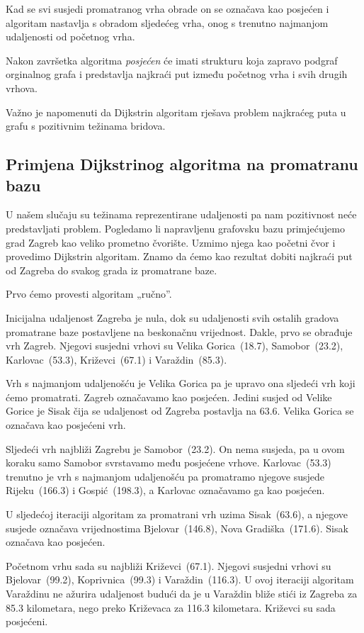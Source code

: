\documentclass[10pt]{scrartcl}
\begin{document}
Kad se svi susjedi promatranog vrha obrade on se označava kao posjećen i algoritam nastavlja s obradom sljedećeg vrha, onog s trenutno najmanjom udaljenosti od početnog vrha.

Nakon završetka algoritma \emph{posjećen} će imati strukturu koja zapravo podgraf orginalnog grafa i predstavlja najkraći put između početnog vrha i svih drugih vrhova. 

Važno je napomenuti da Dijkstrin algoritam rješava problem najkraćeg puta u grafu s pozitivnim težinama bridova.

\subsection{Primjena Dijkstrinog algoritma na promatranu bazu}

U našem slučaju su težinama reprezentirane udaljenosti pa nam pozitivnost neće predstavljati problem. Pogledamo li napravljenu grafovsku bazu primjećujemo grad Zagreb kao veliko prometno čvorište. Uzmimo njega kao početni čvor i provedimo Dijkstrin algoritam. Znamo da ćemo kao rezultat dobiti najkraći put od Zagreba do svakog grada iz promatrane baze.

Prvo ćemo provesti algoritam „ručno”.

Inicijalna udaljenost Zagreba je nula, dok su udaljenosti svih ostalih gradova promatrane baze postavljene na beskonačnu vrijednost. 
Dakle, prvo se obrađuje vrh Zagreb. Njegovi susjedni vrhovi su Velika Gorica~(18.7), Samobor~(23.2), Karlovac~(53.3), Križevci~(67.1) i Varaždin~(85.3). 

Vrh s najmanjom udaljenošću je Velika Gorica pa je upravo ona sljedeći vrh koji ćemo promatrati. Zagreb označavamo kao posjećen.
Jedini susjed od Velike Gorice je Sisak čija se udaljenost od Zagreba postavlja na 63.6. Velika Gorica se označava kao posjećeni vrh.

Sljedeći vrh najbliži Zagrebu je Samobor~(23.2). On nema susjeda, pa u ovom koraku samo Samobor svrstavamo među posjećene vrhove.
Karlovac~(53.3) trenutno je vrh s najmanjom udaljenošću pa promatramo njegove susjede Rijeku~(166.3) i Gospić~(198.3), a Karlovac označavamo ga kao posjećen.

U sljedećoj iteraciji algoritam za promatrani vrh uzima Sisak~(63.6), a njegove susjede označava vrijednostima Bjelovar~(146.8), Nova Gradiška~(171.6). 
Sisak označava kao posjećen.

Početnom vrhu sada su najbliži Križevci~(67.1). Njegovi susjedni vrhovi su Bjelovar~(99.2), Koprivnica~(99.3) i Varaždin~(116.3). U ovoj iteraciji algoritam Varaždinu ne ažurira udaljenost budući da je u Varaždin bliže stići iz Zagreba za 85.3 kilometara, nego preko Križevaca za 116.3 kilometara. Križevci su sada posjećeni.
\end{document}
